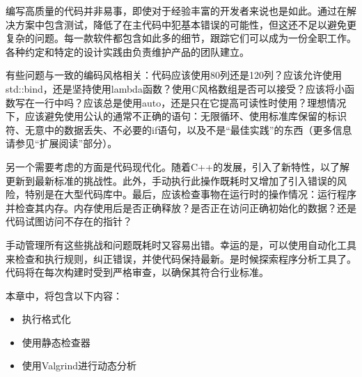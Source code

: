 编写高质量的代码并非易事，即使对于经验丰富的开发者来说也是如此。通过在解决方案中包含测试，降低了在主代码中犯基本错误的可能性，但这还不足以避免更复杂的问题。每一款软件都包含如此多的细节，跟踪它们可以成为一份全职工作。各种约定和特定的设计实践由负责维护产品的团队建立。

有些问题与一致的编码风格相关：代码应该使用80列还是120列？应该允许使用std::bind，还是坚持使用lambda函数？使用C风格数组是否可以接受？应该将小函数写在一行中吗？应该总是使用auto，还是只在它提高可读性时使用？理想情况下，应该避免使用公认的通常不正确的语句：无限循环、使用标准库保留的标识符、无意中的数据丢失、不必要的if语句，以及不是“最佳实践”的东西（更多信息请参见“扩展阅读”部分）。

另一个需要考虑的方面是代码现代化。随着C++的发展，引入了新特性，以了解更新到最新标准的挑战性。此外，手动执行此操作既耗时又增加了引入错误的风险，特别是在大型代码库中。最后，应该检查事物在运行时的操作情况：运行程序并检查其内存。内存使用后是否正确释放？是否正在访问正确初始化的数据？还是代码试图访问不存在的指针？

手动管理所有这些挑战和问题既耗时又容易出错。幸运的是，可以使用自动化工具来检查和执行规则，纠正错误，并使代码保持最新。是时候探索程序分析工具了。代码将在每次构建时受到严格审查，以确保其符合行业标准。

本章中，将包含以下内容：

\begin{itemize}
\item
执行格式化

\item
使用静态检查器

\item
使用Valgrind进行动态分析
\end{itemize}